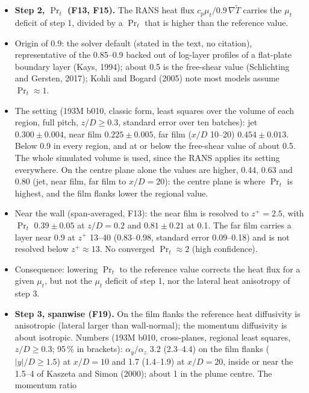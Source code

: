 \documentclass[10pt]{article}
\begin{document}
\begin{itemize}
  (far); the centre plane is the best-aligned part (median 0.83); misalignment sits near the wall and on the film
  flanks (F17). The energy term is largest in the far film, where the RANS mid-pitch layer is laminar (4.1 (iii)).
\item \textbf{Step 2, $\Pr_t$ (F13, F15).} The RANS heat flux $c_p\mu_t/0.9\,\nabla\tilde T$ carries the $\mu_t$
  deficit of step 1, divided by a $\Pr_t$ that is higher than the reference value.
\item Origin of 0.9: the solver default (stated in the text, no citation), representative of the 0.85--0.9
  backed out of log-layer profiles of a flat-plate boundary layer (Kays, 1994); about 0.5 is the free-shear value
  (Schlichting and Gersten, 2017); Kohli and Bogard (2005) note most models assume $\Pr_t\approx1$.
\item The setting (193M b010, classic form, least squares over the volume of each region, full pitch,
  $z/D\ge0.3$, standard error over ten batches): jet $0.300\pm0.004$, near film $0.225\pm0.005$, far film
  ($x/D$ 10--20) $0.454\pm0.013$. Below 0.9 in every region, and at or below
  the free-shear value of about 0.5. The whole simulated volume is used, since the RANS applies its setting
  everywhere. On the centre plane alone the values are higher, 0.44, 0.63 and 0.80 (jet, near film, far film to
  $x/D=20$): the centre plane is where $\Pr_t$ is highest, and the film flanks lower the regional value.
\item Near the wall (span-averaged, F13): the near film is resolved to $z^+=2.5$, with $\Pr_t$ $0.39\pm0.05$ at
  $z/D=0.2$ and $0.81\pm0.21$ at 0.1. The far film carries a layer near 0.9 at $z^+$ 13--40 ($0.83$--$0.98$,
  standard error 0.09--0.18) and is not resolved below $z^+\approx13$. No converged $\Pr_t\approx2$ (high
  confidence).
\item Consequence: lowering $\Pr_t$ to the reference value corrects the heat flux for a given $\mu_t$, but not the
  $\mu_t$ deficit of step 1, nor the lateral heat anisotropy of step 3.
\item \textbf{Step 3, spanwise (F19).} On the film flanks the reference heat diffusivity is anisotropic (lateral
  larger than wall-normal); the momentum diffusivity is about isotropic. Numbers (193M b010, cross-planes, regional least squares, $z/D\ge0.3$; 95\,\% in brackets):
  $\alpha_y/\alpha_z$ 3.2 (2.3--4.4) on the film flanks ($|y|/D\ge1.5$) at $x/D=10$ and 1.7 (1.4--1.9) at
  $x/D=20$, inside or near the 1.5--4 of Kaszeta and Simon (2000); about 1 in the plume centre. The momentum ratio

\end{itemize}
\end{document}
